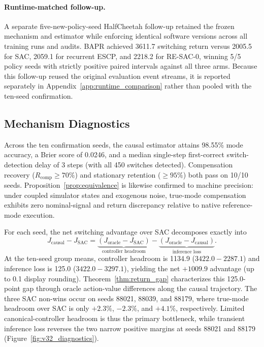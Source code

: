 \documentclass[twoside,11pt]{article}
\newcommand{\resacbaseline}{RE-SAC-0}
\begin{document}
\paragraph{Runtime-matched follow-up.}
A separate five-new-policy-seed HalfCheetah follow-up retained the frozen mechanism and estimator while enforcing identical software versions across all training runs and audits. BAPR achieved 3611.7 switching return versus 2005.5 for SAC, 2059.1 for recurrent ESCP, and 2218.2 for \resacbaseline{}, winning 5/5 policy seeds with strictly positive paired intervals against all three arms. Because this follow-up reused the original evaluation event streams, it is reported separately in Appendix~\ref{app:runtime_comparison} rather than pooled with the ten-seed confirmation.

\subsection{Mechanism Diagnostics}

Across the ten confirmation seeds, the causal estimator attains 98.55\% mode accuracy, a Brier score of 0.0246, and a median single-step first-correct switch-detection delay of 3 steps (with all 450 switches detected). Compensation recovery ($R_{\mathrm{comp}}\ge 70\%$) and stationary retention ($\ge 95\%$) both pass on 10/10 seeds. Proposition~\ref{prop:equivalence} is likewise confirmed to machine precision: under coupled simulator states and exogenous noise, true-mode compensation exhibits zero nominal-signal and return discrepancy relative to native reference-mode execution.

For each seed, the net switching advantage over SAC decomposes exactly into
\begin{equation}
J_{\mathrm{causal}}-J_{\mathrm{SAC}}
=\underbrace{(J_{\mathrm{oracle}}-J_{\mathrm{SAC}})}_{\text{controller headroom}}
-\underbrace{(J_{\mathrm{oracle}}-J_{\mathrm{causal}})}_{\text{inference loss}}.
\label{eq:return_decomposition}
\end{equation}
At the ten-seed group means, controller headroom is 1134.9 ($3422.0-2287.1$) and inference loss is 125.0 ($3422.0-3297.1$), yielding the net $+1009.9$ advantage (up to 0.1 display rounding). Theorem~\ref{thm:return_gap} characterizes this 125.0-point gap through oracle action-value differences along the causal trajectory. The three SAC non-wins occur on seeds 88021, 88039, and 88179, where true-mode headroom over SAC is only $+2.3\%$, $-2.3\%$, and $+4.1\%$, respectively. Limited canonical-controller headroom is thus the primary bottleneck, while transient inference loss reverses the two narrow positive margins at seeds 88021 and 88179 (Figure~\ref{fig:v32_diagnostics}).
\end{document}
